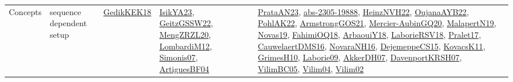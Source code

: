 {\begin{longtable}{lp{3cm}>{\raggedright}p{6cm}>{\raggedright}p{6cm}p{8cm}}
Concepts & sequence dependent setup & \href{articles/GedikKEK18.pdf}{GedikKEK18}\cite{GedikKEK18} & \href{articles/IsikYA23.pdf}{IsikYA23}\cite{IsikYA23}, \href{papers/GeitzGSSW22.pdf}{GeitzGSSW22}\cite{GeitzGSSW22}, \href{articles/MengZRZL20.pdf}{MengZRZL20}\cite{MengZRZL20}, \href{articles/LombardiM12.pdf}{LombardiM12}\cite{LombardiM12}, \href{articles/Simonis07.pdf}{Simonis07}\cite{Simonis07}, \href{papers/ArtiguesBF04.pdf}{ArtiguesBF04}\cite{ArtiguesBF04} & \href{articles/PrataAN23.pdf}{PrataAN23}\cite{PrataAN23}, \href{articles/abs-2305-19888.pdf}{abs-2305-19888}\cite{abs-2305-19888}, \href{articles/HeinzNVH22.pdf}{HeinzNVH22}\cite{HeinzNVH22}, \href{papers/OujanaAYB22.pdf}{OujanaAYB22}\cite{OujanaAYB22}, \href{articles/PohlAK22.pdf}{PohlAK22}\cite{PohlAK22}, \href{papers/ArmstrongGOS21.pdf}{ArmstrongGOS21}\cite{ArmstrongGOS21}, \href{papers/Mercier-AubinGQ20.pdf}{Mercier-AubinGQ20}\cite{Mercier-AubinGQ20}, \href{papers/MalapertN19.pdf}{MalapertN19}\cite{MalapertN19}, \href{articles/Novas19.pdf}{Novas19}\cite{Novas19}, \href{articles/FahimiOQ18.pdf}{FahimiOQ18}\cite{FahimiOQ18}, \href{papers/ArbaouiY18.pdf}{ArbaouiY18}\cite{ArbaouiY18}, \href{articles/LaborieRSV18.pdf}{LaborieRSV18}\cite{LaborieRSV18}, \href{papers/Pralet17.pdf}{Pralet17}\cite{Pralet17}, \href{papers/CauwelaertDMS16.pdf}{CauwelaertDMS16}\cite{CauwelaertDMS16}, \href{articles/NovaraNH16.pdf}{NovaraNH16}\cite{NovaraNH16}, \href{papers/DejemeppeCS15.pdf}{DejemeppeCS15}\cite{DejemeppeCS15}, \href{articles/KovacsK11.pdf}{KovacsK11}\cite{KovacsK11}, \href{papers/GrimesH10.pdf}{GrimesH10}\cite{GrimesH10}, \href{papers/Laborie09.pdf}{Laborie09}\cite{Laborie09}, \href{papers/AkkerDH07.pdf}{AkkerDH07}\cite{AkkerDH07}, \href{papers/DavenportKRSH07.pdf}{DavenportKRSH07}\cite{DavenportKRSH07}, \href{articles/VilimBC05.pdf}{VilimBC05}\cite{VilimBC05}, \href{papers/Vilim04.pdf}{Vilim04}\cite{Vilim04}, \href{papers/Vilim02.pdf}{Vilim02}\cite{Vilim02}\\

\end{longtable}}
